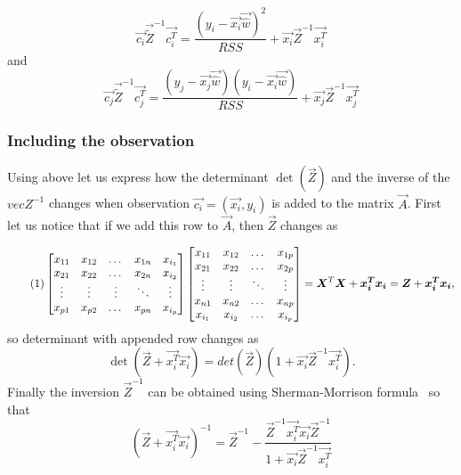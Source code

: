 \begin{equation}
    \vec{c_i} \vec{\tilde{Z}}^{-1} \vec{c_i^T} = \dfrac{ ( y_i - \vec{x_i}\vec{\hat{w}} )^2 }{RSS}  + \vec{x_i}\vec{Z}^{-1}\vec{x_i^T}
\end{equation}
and
\begin{equation}
    \vec{c_j} \vec{\tilde{Z}}^{-1} \vec{c_j^T} = \dfrac{ ( y_j - \vec{x_j}\vec{\hat{w}} ) ( y_i - \vec{x_i}\vec{\hat{w}} ) }{RSS}  + \vec{x_j}\vec{Z}^{-1}\vec{x_j^T}
\end{equation}




\subsubsection*{Including the observation} 

Using above let us express how the determinant $\det(\vec{Z})$ and the inverse of the $vec{Z}^{-1}$ changes when observation $\vec{c_i} = (\vec{x_i}, y_i)$ is added to the matrix $\vec{A}$. First let us notice that if we add this row to $\vec{A}$, then  $\vec{Z}$ changes as

\[ \numberthis \label{addedrow}
\begin{bmatrix}
    x_{11} & x_{12} & \dots  & x_{1n} & x_{i_1}  \\
    x_{21} & x_{22} & \dots  & x_{2n} & x_{i_2} \\
    \vdots & \vdots & \vdots & \ddots & \vdots \\
    x_{p1} & x_{p2} & \dots  & x_{pn} & x_{i_p}     
\end{bmatrix}
\begin{bmatrix}
    x_{11} & x_{12}  & \dots  & x_{1p} \\
    x_{21} & x_{22}  & \dots  & x_{2p} \\
    \vdots  & \vdots & \ddots & \vdots \\
    x_{n1} & x_{n2}  & \dots  & x_{np} \\
    x_{i_1} & x_{i_2}  & \dots  & x_{i_p}
\end{bmatrix}
 = \vec{X}^T\vec{X} + \vec{x_i^T}\vec{x_i} = \vec{Z} + \vec{x_i^T}\vec{x_i},
\]
so determinant with appended row changes as
\begin{equation} \label{udpateddeterminant}
    \det(\vec{Z} + \vec{x_i^T}\vec{x_i}) = det(\vec{Z})(1 + \vec{x_i}\vec{Z}^{-1}\vec{x_i^T}).
\end{equation}
Finally the inversion $\vec{Z}^{-1}$ can be obtained using Sherman-Morrison formula~\cite{bartlett1951inverse} so that 
\begin{equation} \label{shermanmorris}
    (\vec{Z} + \vec{x_i^T}\vec{x_i})^{-1} = \vec{Z}^{-1} - \dfrac{\vec{Z}^{-1}\vec{x_i^T}\vec{x_i}\vec{Z}^{-1}}{1 + \vec{x_i}\vec{Z}^{-1}\vec{x_i^T}}
\end{equation}


